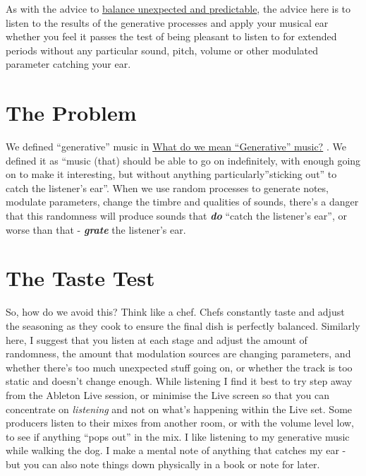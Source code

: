 \documentclass[
  12pt,
  letterpaper,
  oneside,
  open=any]{scrbook}
\begin{document}
\begin{tcolorbox}[enhanced jigsaw, breakable, left=2mm, leftrule=.75mm, toprule=.15mm, opacitybacktitle=0.6, toptitle=1mm, coltitle=black, colback=white, colbacktitle=quarto-callout-tip-color!10!white, opacityback=0, rightrule=.15mm, bottomrule=.15mm, titlerule=0mm, title=\textcolor{quarto-callout-tip-color}{\faLightbulb}\hspace{0.5em}{Key idea}, arc=.35mm, bottomtitle=1mm, colframe=quarto-callout-tip-color-frame]

As with the advice to
\hyperref[Chapter-008-Process-Balance_unexpected_and_predictable]{balance
unexpected and predictable}, the advice here is to listen to the results
of the generative processes and apply your musical ear whether you feel
it passes the test of being pleasant to listen to for extended periods
without any particular sound, pitch, volume or other modulated parameter
catching your ear.

\end{tcolorbox}

\section{The Problem}\label{the-problem}

We defined ``generative'' music in
\hyperref[0000-Defintion-Generative]{What do we mean ``Generative''
music?} . We defined it as ``music (that) should be able to go on
indefinitely, with enough going on to make it interesting, but without
anything particularly''sticking out'' to catch the listener's ear''.
When we use random processes to generate notes, modulate parameters,
change the timbre and qualities of sounds, there's a danger that this
randomness will produce sounds that \textbf{\emph{do}} ``catch the
listener's ear'', or worse than that - \textbf{\emph{grate}} the
listener's ear.

\section{The Taste Test}\label{the-taste-test}

So, how do we avoid this? Think like a chef. Chefs constantly taste and
adjust the seasoning as they cook to ensure the final dish is perfectly
balanced. Similarly here, I suggest that you listen at each stage and
adjust the amount of randomness, the amount that modulation sources are
changing parameters, and whether there's too much unexpected stuff going
on, or whether the track is too static and doesn't change enough. While
listening I find it best to try step away from the Ableton Live session,
or minimise the Live screen so that you can concentrate on
\emph{listening} and not on what's happening within the Live set. Some
producers listen to their mixes from another room, or with the volume
level low, to see if anything ``pops out'' in the mix. I like listening
to my generative music while walking the dog. I make a mental note of
anything that catches my ear - but you can also note things down
physically in a book or note for later.
\end{document}
